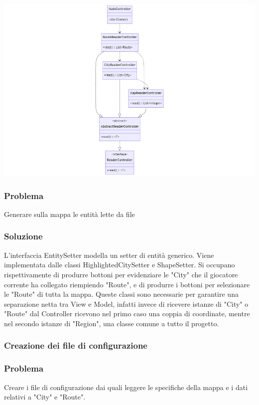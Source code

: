 \documentclass[a4paper,12pt]{report}
\begin{document}
\begin{center}
\includegraphics[scale=0.5]{mermaid-diagram-2024-02-22-222754.png}
\end{center}

\subsubsection{Problema}
Generare sulla mappa le entità lette da file

\subsubsection{Soluzione}
L'interfaccia EntitySetter modella un setter di entità generico. Viene implementata dalle classi HighlightedCitySetter e ShapeSetter. 
%
Si occupano rispettivamente di produrre bottoni per evidenziare le "City" che il giocatore corrente ha collegato riempiendo "Route", e di produrre i bottoni per selezionare le "Route" di tutta la mappa.
%
Queste classi sono necessarie per garantire una separazione netta tra View e Model, infatti invece di ricevere istanze di "City" o "Route" dal Controller ricevono nel primo caso una coppia di coordinate, mentre nel secondo istanze di "Region", una classe comune a tutto il progetto.

\subsubsection{Creazione dei file di configurazione}
\subsubsection{Problema}
Creare i file di configurazione dai quali leggere le specifiche della mappa e i dati relativi a "City" e "Route".
\end{document}
